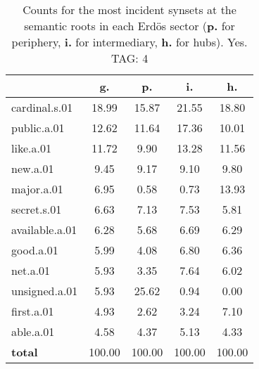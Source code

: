 \begin{table}[h!]
\begin{center}
\begin{tabular}{| l || c | c | c | c |}\hline
 & {\bf g.} & {\bf p.} & {\bf i.} & {\bf h.} \\\hline\hline
cardinal.s.01 & 18.99  & 15.87  & 21.55  & 18.80 \\\hline
public.a.01 & 12.62  & 11.64  & 17.36  & 10.01 \\\hline
like.a.01 & 11.72  & 9.90  & 13.28  & 11.56 \\\hline
new.a.01 & 9.45  & 9.17  & 9.10  & 9.80 \\\hline
major.a.01 & 6.95  & 0.58  & 0.73  & 13.93 \\\hline
secret.s.01 & 6.63  & 7.13  & 7.53  & 5.81 \\\hline
available.a.01 & 6.28  & 5.68  & 6.69  & 6.29 \\\hline
good.a.01 & 5.99  & 4.08  & 6.80  & 6.36 \\\hline
net.a.01 & 5.93  & 3.35  & 7.64  & 6.02 \\\hline
unsigned.a.01 & 5.93  & 25.62  & 0.94  & 0.00 \\\hline
first.a.01 & 4.93  & 2.62  & 3.24  & 7.10 \\\hline
able.a.01 & 4.58  & 4.37  & 5.13  & 4.33 \\\hline\hline
{{\bf total}} & 100.00  & 100.00  & 100.00  & 100.00 \\\hline
\end{tabular}
\caption{Counts for the most incident synsets at the semantic roots in each Erd\"os sector ({\bf p.} for periphery, {\bf i.} for intermediary, {\bf h.} for hubs). Yes. TAG: 4}
\end{center}
\end{table}